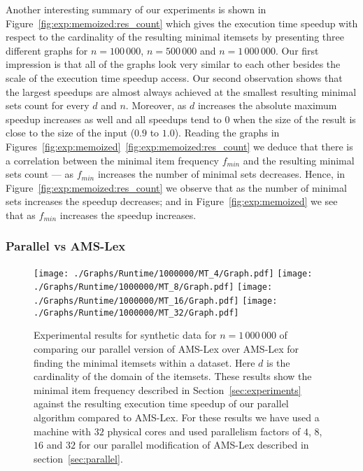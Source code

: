 \documentclass[13pt,a4paper]{article}
\begin{document}
Another interesting summary of our experiments is shown in Figure~\ref{fig:exp:memoized:res_count} which gives the execution time speedup with respect to the cardinality of the resulting minimal itemsets by presenting three different graphs for $n = 100\,000$, $n = 500\,000$ and $n = 1\,000\,000$. Our first impression is that all of the graphs look very similar to each other besides the scale of the execution time speedup access. Our second observation shows that the largest speedups are almost always achieved at the smallest resulting minimal sets count for every $d$ and $n$. Moreover, as $d$ increases the absolute maximum speedup increases as well and all speedups tend to $0$ when the size of the result is close to the size of the input ($0.9$ to $1.0$). Reading the graphs in Figures~\ref{fig:exp:memoized}~\ref{fig:exp:memoized:res_count} we deduce that there is a correlation between the minimal item frequency $f_{min}$ and the resulting minimal sets count --- as $f_{min}$ increases the number of minimal sets decreases. Hence, in Figure~\ref{fig:exp:memoized:res_count} we observe that as the number of minimal sets increases the speedup decreases; and in Figure~\ref{fig:exp:memoized} we see that as $f_{min}$ increases the speedup increases.

\subsubsection{Parallel vs AMS-Lex}
\label{sec:exp:synth:prallel_AMS}

\begin{figure} [t]
	\centering
	\texttt{[image: ./Graphs/Runtime/1000000/MT\_4/Graph.pdf]}
	\texttt{[image: ./Graphs/Runtime/1000000/MT\_8/Graph.pdf]}
	\texttt{[image: ./Graphs/Runtime/1000000/MT\_16/Graph.pdf]}
	\texttt{[image: ./Graphs/Runtime/1000000/MT\_32/Graph.pdf]}
	\caption{Experimental results for synthetic data for $n = 1\,000\,000$ of comparing our parallel version of AMS-Lex over AMS-Lex for finding the minimal itemsets within a dataset. Here $d$ is the cardinality of the domain of the itemsets. These results show the minimal item frequency described in Section~\ref{sec:experiments} against the resulting execution time speedup of our parallel algorithm compared to AMS-Lex. For these results we have used a machine with $32$ physical cores and used parallelism factors of $4$, $8$, $16$ and $32$ for our parallel modification of AMS-Lex described in section~\ref{sec:parallel}.}
	\label{fig:exp:parallel}
\end{figure}
\end{document}
